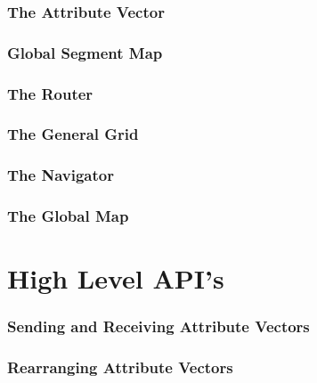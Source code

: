 \documentclass{article}
\begin{document}
\section{The Attribute Vector}

\vspace*{\fill}
\newpage

\vspace*{\fill}
\newpage

\vspace*{\fill}
\newpage
%
\section{Global Segment Map}

\vspace*{\fill}
\newpage

\vspace*{\fill}
\newpage
%
\section{The Router}

\vspace*{\fill}
\newpage
%
\section{The General Grid}

\vspace*{\fill}
\newpage

\vspace*{\fill}
\newpage
%
\section{The Navigator}

\vspace*{\fill}
\newpage
%
\section{The Global Map}

\vspace*{\fill}
\newpage
%
%
\part{High Level API's}
%
\section{Sending and Receiving Attribute Vectors}

\vspace*{\fill}
\newpage
%
\section{Rearranging Attribute Vectors}

\vspace*{\fill}
\newpage
%
\end{document}
